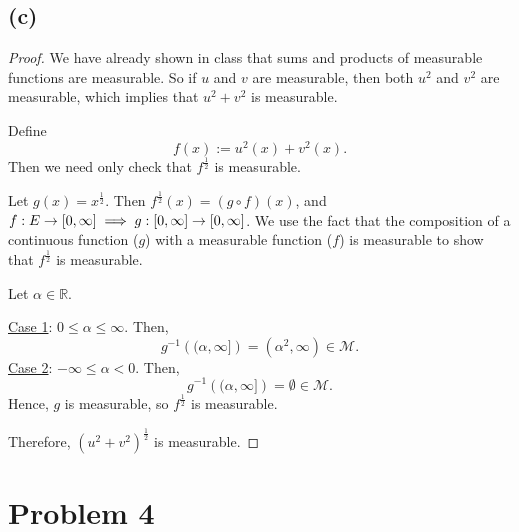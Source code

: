 \documentclass{article}
\newcommand{\R}{\mathbb{R}} %
\newcommand{\M}{\mathcal{M}} %
\begin{document}
\subsection*{(c)}
\begin{proof}
	We have already shown in class that sums and products of measurable functions are measurable. So if $u$ and $v$ are measurable, then both $u^2$ and $v^2$ are measurable, which implies that $u^2 + v^2$ is measurable.
	
	Define
	\begin{equation}
		f(x) := u^2(x) + v^2(x).
	\end{equation}
	Then we need only check that $f^{\frac{1}{2}}$ is measurable.
	
	Let $g(x) = x^{\frac{1}{2}}$. Then $f^{\frac{1}{2}}(x) = (g \circ f)(x)$, and $f: E \rightarrow [0,\infty] \\ \implies g: [0, \infty] \rightarrow [0, \infty]$. We use the fact that the composition of a continuous function ($g$) with a measurable function ($f$) is measurable to show that $f^{\frac{1}{2}}$ is measurable. 
	
	Let $\alpha \in \R$.
	
	\underline{Case 1}: $0 \leq \alpha \leq \infty$. Then,
	\begin{equation}
		g^{-1}\left((\alpha, \infty]\right) = (\alpha^2, \infty) \in \M.
	\end{equation}
	\underline{Case 2}: $-\infty \leq \alpha < 0$. Then,
	\begin{equation}
		g^{-1}\left((\alpha, \infty]\right) = \emptyset \in \M.
	\end{equation}
	Hence, $g$ is measurable, so $f^{\frac{1}{2}}$ is measurable.
	
	Therefore, $(u^2 + v^2)^{\frac{1}{2}}$ is measurable.
\end{proof}
\section*{Problem 4}
\end{document}
